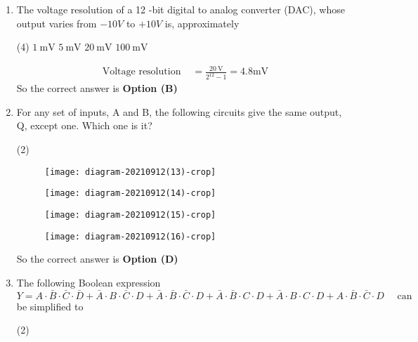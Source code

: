 \begin{enumerate}
	\item The voltage resolution of a 12 -bit digital to analog converter (DAC), whose output varies from $-10 V$ to $+10 V$ is, approximately
	{	}
	\begin{tasks}(4)
		\task[\textbf{A.}] $1\  \mathrm{mV}$
		\task[\textbf{B.}] $5 \ \mathrm{mV}$
		\task[\textbf{C.}] $20 \ \mathrm{mV}$
		\task[\textbf{D.}] $100 \ \mathrm{mV}$
	\end{tasks}
	\begin{answer}
		\begin{align*}
		\text{Voltage resolution }&=\frac{20 \mathrm{~V}}{2^{12}-1}=4.8 \mathrm{mV}
		\end{align*}
		So the correct answer is \textbf{Option (B)}
	\end{answer}
	\item For any set of inputs, A and B, the following circuits give the same output, Q, except one. Which one is it?
	{	}
	\begin{tasks}(2)
		\task[\textbf{A.}] \begin{figure}[H]
			\centering
			\texttt{[image: diagram-20210912(13)-crop]}
		\end{figure}
		\task[\textbf{B.}]\begin{figure}[H]
			\centering
			\texttt{[image: diagram-20210912(14)-crop]}
		\end{figure}
		\task[\textbf{C.}] \begin{figure}[H]
			\centering
			\texttt{[image: diagram-20210912(15)-crop]}
		\end{figure}
		\task[\textbf{D.}]\begin{figure}[H]
			\centering
			\texttt{[image: diagram-20210912(16)-crop]}
		\end{figure}
	\end{tasks}
	\begin{answer}
		So the correct answer is \textbf{Option (D)}
	\end{answer}
	\item The following Boolean expression
	$$
	Y=A \cdot \bar{B} \cdot \bar{C} \cdot \bar{D}+\bar{A} \cdot B \cdot \bar{C} \cdot D+\bar{A} \cdot \bar{B} \cdot \bar{C} \cdot D+\bar{A} \cdot \bar{B} \cdot C \cdot D+\bar{A} \cdot B \cdot C \cdot D+A \cdot \bar{B} \cdot \bar{C} \cdot D \quad \text { can }
	$$
	be simplified to
	{	}
	\begin{tasks}(2)

\end{tasks}
\end{enumerate}
